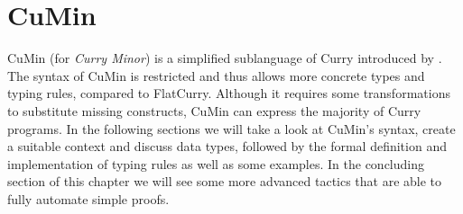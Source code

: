 \documentclass[paper = a4, fleqn, abstract=on, twoside]{scrreprt}
\begin{document}
\chapter{CuMin}
\label{cumin}
CuMin (for \textit{Curry Minor}) is a simplified sublanguage of Curry introduced by \citet{p19mehner}. The syntax of CuMin is restricted and thus allows more concrete types and typing rules, compared to FlatCurry. Although it requires some transformations to substitute missing constructs, CuMin can express the majority of Curry programs. In the following sections we will take a look at CuMin's syntax, create a suitable context and discuss data types, followed by the formal definition and implementation of typing rules as well as some examples. In the concluding section of this chapter we will see some more advanced tactics that are able to fully automate simple proofs.
\end{document}
